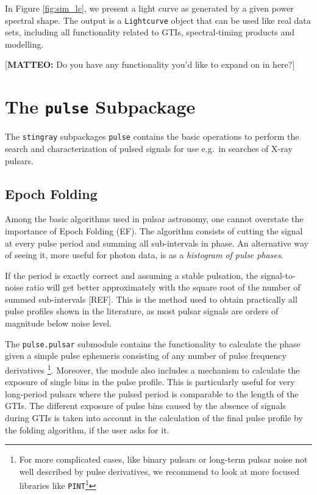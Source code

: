 \documentclass[twocolumn]{aastex62}
\newcommand{\stingray}{\texttt{stingray}\xspace}
\begin{document}
In Figure \ref{fig:sim_lc}, we present a light curve as generated by a given power spectral shape. The output is a \texttt{Lightcurve} object that can be used like real data sets, including all functionality related to GTIs, spectral-timing products and modelling. 

[\textbf{MATTEO:} Do you have any functionality you'd like to expand on in here?]


\section{The \texttt{pulse} Subpackage}
\label{sec:pulsar}
The \stingray subpackages \texttt{pulse} contains the basic operations to perform the search and characterization of pulsed signals for use e.g.\ in searches of X-ray pulsars.

\subsection{Epoch Folding}
Among the basic algorithms used in pulsar astronomy, one cannot overstate the importance of Epoch Folding (EF).
The algorithm consists of cutting the signal at every pulse period and summing all sub-intervals in phase. 
An alternative way of seeing it, more useful for photon data, is as a \textit {histogram of pulse phases}.

If the period is exactly correct and assuming a stable pulsation, the signal-to-noise ratio will get better approximately with the square root of the number of summed sub-intervals [REF].
This is the method used to obtain practically all pulse profiles shown in the literature, as most pulsar signals are orders of magnitude below noise level.

The \texttt{pulse.pulsar} submodule contains the functionality to calculate the phase given a simple pulse ephemeris consisting of any number of pulse frequency derivatives%
\footnote{For more complicated cases, like binary pulsars or long-term pulsar noise not well described by pulse derivatives, we recommend to look at more focused libraries like \texttt{PINT}\footnote{\url{https://github.com/nanograv/PINT}}}.
Moreover, the module also includes a mechanism to calculate the exposure of single bins in the pulse profile. 
This is particularly useful for very long-period pulsars where the pulsed period is comparable to the length of the GTIs.
The different exposure of pulse bins caused by the absence of signals during GTIs is taken into account in the calculation of the final pulse profile by the folding algorithm, if the user asks for it. 
\end{document}
